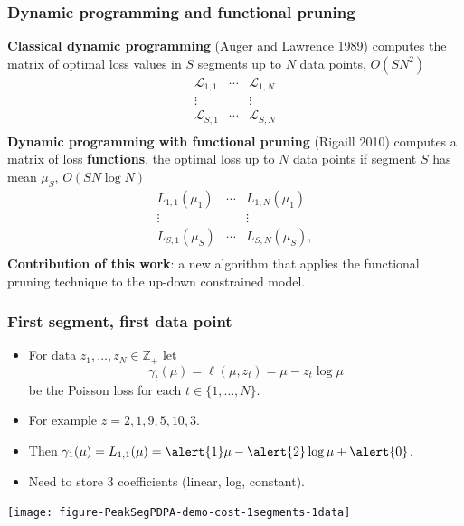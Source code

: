 \documentclass{beamer}
\newcommand{\ZZ}{\mathbb Z}
\begin{document}
\begin{frame}
  \frametitle{Dynamic programming and functional pruning}
  \textbf{Classical dynamic programming} (Auger and Lawrence 1989) computes the matrix of optimal loss
  values in $S$ segments up to $N$ data points, $O(S N^2)$
$$
\begin{array}{ccc}
  \mathcal L_{1,1} & \cdots &   \mathcal L_{1,N}\\
  \vdots &  & \vdots\\
  \mathcal L_{S,1} & \cdots & \mathcal L_{S,N}\\
\end{array}
$$
\textbf{Dynamic programming with functional pruning} (Rigaill
2010) computes a matrix of loss \textbf{functions}, the
optimal loss up to $N$ data points if segment $S$ has mean $\mu_S$,
$O(S N\log N)$
$$
\begin{array}{ccc}
   L_{1,1}(\mu_1) & \cdots & L_{1,N}(\mu_1)\\
  \vdots &  & \vdots\\
   L_{S,1}(\mu_S) & \cdots & L_{S,N}(\mu_S),\\
\end{array}
$$
\textbf{Contribution of this work}: a new algorithm that applies the
functional pruning technique to the up-down constrained model.
\end{frame}

\begin{frame}
  \frametitle{First segment, first data point}
  \begin{itemize}
  \item For data $z_1, \dots, z_N\in\ZZ_+$ let
  \begin{equation*}
    \gamma_t(\mu) = \ell(\mu, z_t) = \mu - z_t \log \mu
  \end{equation*}
  be the Poisson loss for each $t\in\{1, \dots, N\}$.
\item For example $z = 2, 1, 9, 5, 10, 3$.
\item Then $\gamma_1(\mu)=L_{1,1}(\mu)= \alert{1}\mu - \alert{2}\log \mu + \alert{0}$.
\item Need to store 3 coefficients (\alert{linear}, \alert{log}, \alert{constant}).
  \end{itemize}
  \begin{center}
    \texttt{[image: figure-PeakSegPDPA-demo-cost-1segments-1data]}
  \end{center}
\end{frame}
\end{document}
